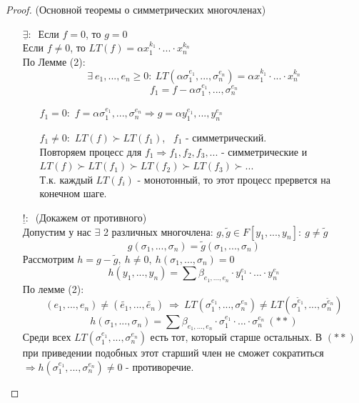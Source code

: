 \documentclass[a4paper, 12pt]{article}
\theoremstyle{definition}
\begin{document}
  \begin{proof} (Основной теоремы о симметрических многочленах) 
    \begin{itemize}
      \item[$\underline{\exists}: \ $] Если $f = 0$, то $g = 0$\\
      Если $f \neq 0$, то $LT(f) = \alpha x_1^{k_1} \cdot ... \cdot x_n^{k_n}$\\
      По Лемме (2): 
      $$\exists \ e_1,...,e_n \geq 0: \ LT(\alpha \sigma_1^{e_1},...,\sigma_n^{e_n}) = \alpha x_1^{k_1} \cdot ... \cdot x_n^{k_n}$$
      $$f_1 = f - \alpha \sigma_1^{e_1},...,\sigma_n^{e_n}$$
      \begin{itemize}
        \item[$f_1 = 0:$] $f = \alpha \sigma_1^{e_1},...,\sigma_n^{e_n} \Longrightarrow g = \alpha y_1^{e_1},...,y_n^{e_n}$
        \item[$f_1 \neq 0:$] $LT(f) \succ LT(f_1)$, \ $f_1$ - симметрический.\\
        Повторяем процесс для $f_1 \Longrightarrow f_1,f_2,f_3,...$ - симметрические и\\
        $LT(f) \succ LT(f_1) \succ LT(f_2) \succ LT(f_3) \succ ...$\\
        Т.к. каждый $LT(f_i)$ - монотонный, то этот процесс прервется на конечном шаге.   
      \end{itemize}
      \item[$\underline{!}: \ $] (Докажем от противного)\\
      Допустим у нас $\exists$  2 различных многочлена: $g, \widetilde{g} \in F[y_1,...,y_n]: \ g \neq \widetilde{g}$ 
      $$g(\sigma_1,...,\sigma_n) = \widetilde{g}(\sigma_1,...,\sigma_n)$$
      Рассмотрим $h = g - \widetilde{g}, \ h \neq 0, \ h(\sigma_1,...,\sigma_n) = 0$
      $$h(y_1,...,y_n) = \sum \beta_{e_1,...,e_n} \cdot y_1^{e_1} \cdot ... \cdot y_n^{e_n}$$
      По лемме (2):
      $$(e_1,...,e_n) \neq (\widetilde{e_1},...,\widetilde{e_n})\ \Longrightarrow \ LT(\sigma_1^{e_1},...,\sigma_n^{e_n}) \neq LT(\sigma_1^{\widetilde{e}_1},...,\sigma_n^{\widetilde{e}_n})$$
      $$h(\sigma_1,...,\sigma_n) = \sum \beta_{e_1,...,e_n} \cdot \sigma_1^{e_1} \cdot ... \cdot \sigma_n^{e_n} \ (**)$$
      Среди всех $LT(\sigma_1^{e_1},...,\sigma_n^{e_n})$ есть тот, который старше остальных. В $(**)$ при приведении подобных этот старший член не сможет сократиться $\Longrightarrow h(\sigma_1^{e_1},...,\sigma_n^{e_n}) \neq 0$ - противоречие. 
    \end{itemize}
  \end{proof}
\end{document}
